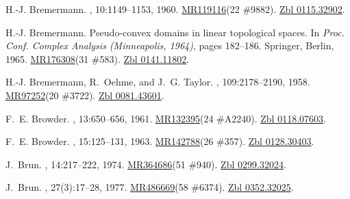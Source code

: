 \documentclass[11pt,a4paper, final, twoside]{article}
\numberwithin{equation}{section}
\begin{document}
\begin{appendices}
\begin{thebibliography}{100}
H.-J. Bremermann.
, 10:1149--1153, 1960.
\newblock \href{http://www.ams.org/mathscinet-getitem?mr=119116}{MR119116}(22
  \#9882). \href{http://zbmath.org/?q=an:0115.32902}{Zbl 0115.32902}.

H.-J. Bremermann.
\newblock Pseudo-convex domains in linear topological spaces.
\newblock In {\em Proc. {C}onf. {C}omplex {A}nalysis ({M}inneapolis, 1964)},
  pages 182--186. Springer, Berlin, 1965.
\newblock \href{http://www.ams.org/mathscinet-getitem?mr=176308}{MR176308}(31
  \#583). \href{http://zbmath.org/?q=an:0141.11802}{Zbl 0141.11802}.

H.-J. {Bremermann}, R.~{Oehme}, and J.~G. {Taylor}.
, 109:2178--2190, 1958.
\newblock \href{http://www.ams.org/mathscinet-getitem?mr=97252}{MR97252}(20
  \#3722). \href{http://zbmath.org/?q=an:0081.43601}{Zbl 0081.43601}.

F.~E. Browder.
, 13:650--656, 1961.
\newblock \href{http://www.ams.org/mathscinet-getitem?mr=132395}{MR132395}(24
  \#A2240). \href{http://zbmath.org/?q=an:0118.07603}{Zbl 0118.07603}.

F.~E. Browder.
, 15:125--131, 1963.
\newblock \href{http://www.ams.org/mathscinet-getitem?mr=142788}{MR142788}(26
  \#357). \href{http://zbmath.org/?q=an:0128.30403}{Zbl 0128.30403}.

J.~Brun.
, 14:217--222, 1974.
\newblock \href{http://www.ams.org/mathscinet-getitem?mr=364686}{MR364686}(51
  \#940). \href{http://zbmath.org/?q=an:0299.32024}{Zbl 0299.32024}.

J.~Brun.
, 27(3):17--28, 1977.
\newblock \href{http://www.ams.org/mathscinet-getitem?mr=486669}{MR486669}(58
  \#6374). \href{http://zbmath.org/?q=an:0352.32025}{Zbl 0352.32025}.


\end{thebibliography}
\end{appendices}
\end{document}
